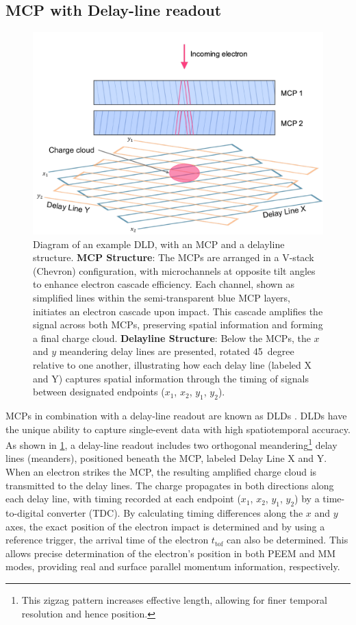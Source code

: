 \subsection{MCP with Delay-line readout}
\begin{figure}
    \centering
    \includegraphics[width=0.9\linewidth]{images/dld.pdf}
    \caption{Diagram of an example \gls{DLD}, with an \gls{MCP} and a delayline structure. \textbf{\gls{MCP} Structure}: The \glspl{MCP} are arranged in a V-stack (Chevron) configuration, with microchannels at opposite tilt angles to enhance electron cascade efficiency. Each channel, shown as simplified lines within the semi-transparent blue \gls{MCP} layers, initiates an electron cascade upon impact. This cascade amplifies the signal across both \glspl{MCP}, preserving spatial information and forming a final charge cloud. \textbf{Delayline Structure}: Below the \glspl{MCP}, the $x$ and $y$ meandering delay lines are presented, rotated \qty{45}{degree} relative to one another, illustrating how each delay line (labeled X and Y) captures spatial information through the timing of signals between designated endpoints ($x_1$, $x_2$, $y_1$, $y_2$).}
    \label{fig:dld}
\end{figure}
\Glspl{MCP} in combination with a delay-line readout are known as \glspl{DLD} \cite{oelsnerMicrospectroscopyImagingUsing2001}. \Glspl{DLD} have the unique ability to capture single-event data with high spatiotemporal accuracy. As shown in \cref{fig:dld}, a delay-line readout includes two orthogonal meandering\footnote{This zigzag pattern increases effective length, allowing for finer temporal resolution and hence position.} delay lines (meanders), positioned beneath the MCP, labeled Delay Line X and Y. When an electron strikes the \gls{MCP}, the resulting amplified charge cloud is transmitted to the delay lines. The charge propagates in both directions along each delay line, with timing recorded at each endpoint ($x_1$, $x_2$, $y_1$, $y_2$) by a time-to-digital converter (TDC). By calculating timing differences along the $x$ and $y$ axes, the exact position of the electron impact is determined and by using a reference trigger, the arrival time of the electron $t_{\text{tof}}$ can also be determined. This allows precise determination of the electron's position in both \gls{PEEM} and \gls{MM} modes, providing real and surface parallel momentum information, respectively.

